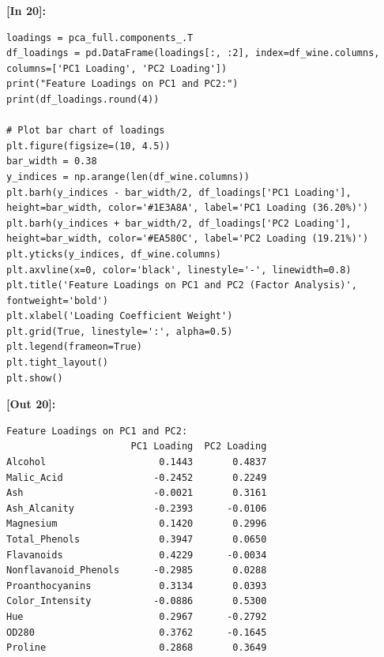 \vspace{0.4em}
\noindent\textbf{\small [In 20]:}
\begin{lstlisting}[style=pycode]
loadings = pca_full.components_.T
df_loadings = pd.DataFrame(loadings[:, :2], index=df_wine.columns, columns=['PC1 Loading', 'PC2 Loading'])
print("Feature Loadings on PC1 and PC2:")
print(df_loadings.round(4))

# Plot bar chart of loadings
plt.figure(figsize=(10, 4.5))
bar_width = 0.38
y_indices = np.arange(len(df_wine.columns))
plt.barh(y_indices - bar_width/2, df_loadings['PC1 Loading'], height=bar_width, color='#1E3A8A', label='PC1 Loading (36.20%)')
plt.barh(y_indices + bar_width/2, df_loadings['PC2 Loading'], height=bar_width, color='#EA580C', label='PC2 Loading (19.21%)')
plt.yticks(y_indices, df_wine.columns)
plt.axvline(x=0, color='black', linestyle='-', linewidth=0.8)
plt.title('Feature Loadings on PC1 and PC2 (Factor Analysis)', fontweight='bold')
plt.xlabel('Loading Coefficient Weight')
plt.grid(True, linestyle=':', alpha=0.5)
plt.legend(frameon=True)
plt.tight_layout()
plt.show()
\end{lstlisting}
\noindent\textbf{\small [Out 20]:}
\begin{lstlisting}[style=output]
Feature Loadings on PC1 and PC2:
                      PC1 Loading  PC2 Loading
Alcohol                    0.1443       0.4837
Malic_Acid                -0.2452       0.2249
Ash                       -0.0021       0.3161
Ash_Alcanity              -0.2393      -0.0106
Magnesium                  0.1420       0.2996
Total_Phenols              0.3947       0.0650
Flavanoids                 0.4229      -0.0034
Nonflavanoid_Phenols      -0.2985       0.0288
Proanthocyanins            0.3134       0.0393
Color_Intensity           -0.0886       0.5300
Hue                        0.2967      -0.2792
OD280                      0.3762      -0.1645
Proline                    0.2868       0.3649
\end{lstlisting}

